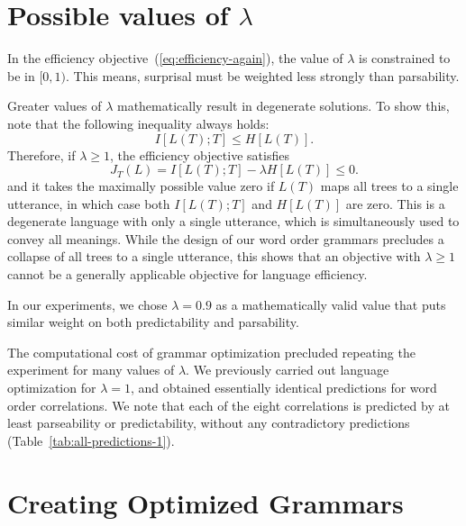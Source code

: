 \documentclass[10pt,twoside,lineno]{article}
\begin{document}
\section{Possible values of $\lambda$}\label{sec:lambda}

In the efficiency objective~(\ref{eq:efficiency-again}), the value of $\lambda$ is constrained to be in $[0,1)$.
This means, surprisal must be weighted less strongly than parsability.

Greater values of $\lambda$ mathematically result in degenerate solutions.
To show this, note that the following inequality always holds:
\begin{equation}
I[L(T); T] \leq H[L(T)].
\end{equation}
Therefore, if $\lambda \geq 1$, the efficiency objective satisfies 
\begin{equation}
    J_T(L) = I[L(T); T] - \lambda H[L(T)] \leq 0.
\end{equation}
and it takes the maximally possible value zero if $L(T)$ maps all trees to a single utterance, in which case both $I[L(T); T]$ and $H[L(T)]$ are zero.
This is a degenerate language with only a single utterance, which is simultaneously used to convey all meanings.
While the design of our word order grammars precludes a collapse of all trees to a single utterance, this shows that an objective with $\lambda \geq 1$ cannot be a generally applicable objective for language efficiency.

In our experiments, we chose $\lambda = 0.9$ as a mathematically valid value that puts similar weight on both predictability and parsability.

The computational cost of grammar optimization precluded repeating the experiment for many values of $\lambda$.
We previously carried out language optimization for $\lambda = 1$, and obtained essentially identical predictions for word order correlations.
We note that each of the eight correlations is predicted by at least parseability or predictability, without any contradictory predictions (Table~\ref{tab:all-predictions-1}).

\section{Creating Optimized Grammars}
\end{document}
